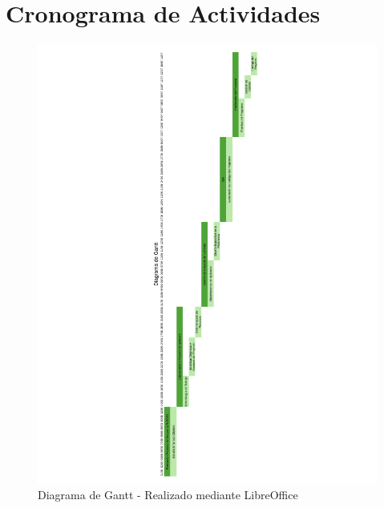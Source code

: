 \section{Cronograma de Actividades}
\begin{figure}[htb]
	\centering
	\includegraphics[width=1.2\linewidth]{capitulo4/img/Gantt.png}
	\caption{Diagrama de Gantt - Realizado mediante LibreOffice}
\end{figure}
